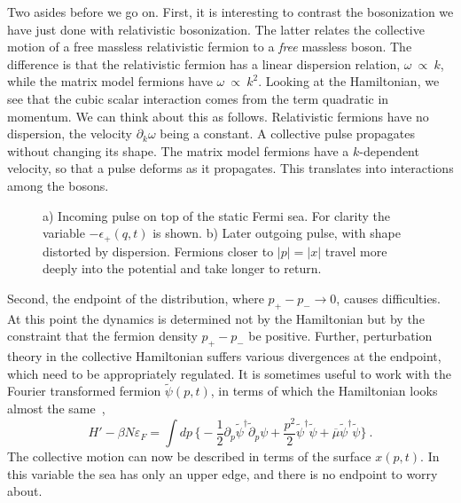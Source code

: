 Two asides before we go on.  First, it is interesting to
contrast the bosonization we have just done with relativistic
bosonization.  The latter relates the collective motion of a
free massless relativistic fermion to a {\it free} massless boson.
The difference is that the relativistic fermion has a linear
dispersion relation, $\omega \ \propto\ k$, while the matrix
model fermions have $\omega \ \propto\ k^2$.  Looking at the
Hamiltonian, we see that the cubic scalar interaction comes from
the term quadratic in momentum.  We can think about this as
follows.  Relativistic fermions have no dispersion, the
velocity $\partial_k \omega$ being a constant.  A collective
pulse propagates without changing its shape.
The matrix model fermions have a $k$-dependent velocity,
so that a pulse deforms as it propagates.  This translates
into interactions among the bosons.
\begin{figure}
\begin{center}
\leavevmode
{}
\end{center}
\caption[]{a) Incoming pulse on top of the static Fermi sea.
For clarity the variable $-\epsilon_+(q,t)$ is shown.
b) Later outgoing pulse, with shape distorted by dispersion.
Fermions closer to $|p| = |x|$ travel more deeply into the
potential and take longer to return.}
\end{figure}

Second, the endpoint of the distribution,
where $p_+ - p_- \to 0$, causes difficulties.  At this point the
dynamics is determined not by the Hamiltonian but by the
constraint that the fermion density $p_+ - p_-$ be positive. 
Further, perturbation theory in the collective Hamiltonian
suffers various divergences at the endpoint, which need to be
appropriately regulated.  It is sometimes useful to work with
the Fourier transformed fermion $\tilde \psi(p,t)$, in terms
of which the Hamiltonian looks almost the same~\cite{Kcomm},
\begin{equation}
H' - \beta N \varepsilon_F =  \int dp\, \biggl\{ -\frac{1}{2}
\partial_p \tilde\psi^\dagger \tilde\partial_p \psi 
+ \frac{p^2}{2} \tilde\psi^\dagger\tilde\psi + \overline\mu
\tilde\psi^\dagger\tilde\psi
\biggr\}\ .
\label{xtop}
\end{equation}
The collective motion can now be described in terms of the
surface $x(p, t)$.  In this variable the sea has only an upper
edge, and there is no endpoint to worry about.


